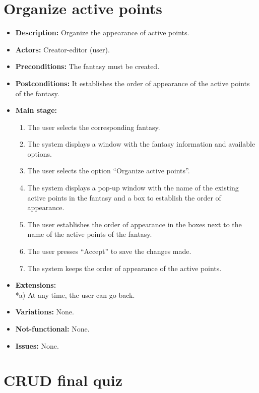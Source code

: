 \section{Organize active points}
\begin{itemize}
	\item \textbf{Description:} Organize the appearance of active points.
	\item \textbf{Actors:} Creator-editor (user).
	\item \textbf{Preconditions:} The fantasy must be created.
	\item \textbf{Postconditions:} It establishes the order of appearance of the active points of the fantasy.
	\item \textbf{Main stage:}
	\begin{enumerate}
		\item The user selects the corresponding fantasy.
		\item The system displays a window with the fantasy information and available options.
		\item The user selects the option ``Organize active points''.
		\item The system displays a pop-up window with the name of the existing active points in the fantasy and a box to establish the order of appearance.
		\item The user establishes the order of appearance in the boxes next to the name of the active points of the fantasy.
		\item The user presses ``Accept'' to save the changes made.
		\item The system keeps the order of appearance of the active points.
	\end{enumerate}
	\item \textbf{Extensions:} \\ *a) At any time, the user can go back.
	\item \textbf{Variations:} None.
	\item \textbf{Not-functional:} None.
	\item \textbf{Issues:} None.
\end{itemize}

\section{CRUD final quiz}
\hypertarget{crearquizfinal}{}
